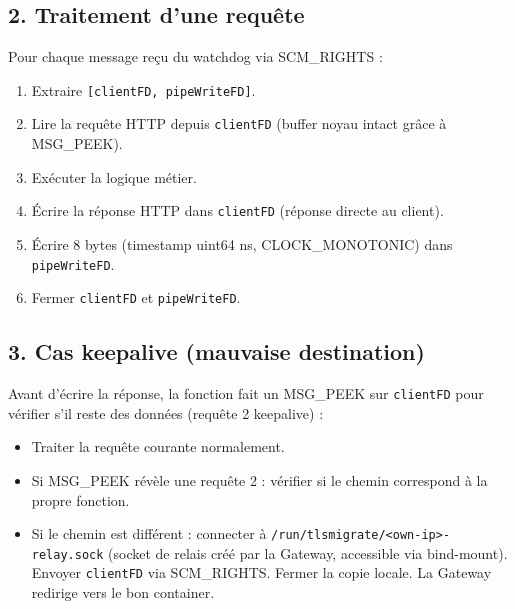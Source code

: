 \documentclass[11pt,a4paper]{article}
\begin{document}
\subsection{2. Traitement d'une requête}
Pour chaque message reçu du watchdog via SCM\_RIGHTS :
\begin{enumerate}
  \item Extraire \texttt{[clientFD, pipeWriteFD]}.
  \item Lire la requête HTTP depuis \texttt{clientFD} (buffer noyau intact grâce à MSG\_PEEK).
  \item Exécuter la logique métier.
  \item Écrire la réponse HTTP dans \texttt{clientFD} (réponse directe au client).
  \item Écrire 8 bytes (timestamp uint64 ns, CLOCK\_MONOTONIC) dans \texttt{pipeWriteFD}.
  \item Fermer \texttt{clientFD} et \texttt{pipeWriteFD}.
\end{enumerate}

\subsection{3. Cas keepalive (mauvaise destination)}
Avant d'écrire la réponse, la fonction fait un MSG\_PEEK sur \texttt{clientFD}
pour vérifier s'il reste des données (requête 2 keepalive) :
\begin{itemize}
  \item Traiter la requête courante normalement.
  \item Si MSG\_PEEK révèle une requête 2 : vérifier si le chemin correspond à la
    propre fonction.
  \item Si le chemin est différent : connecter à
    \texttt{/run/tlsmigrate/<own-ip>-relay.sock} (socket de relais créé par la Gateway,
    accessible via bind-mount). Envoyer \texttt{clientFD} via SCM\_RIGHTS.
    Fermer la copie locale. La Gateway redirige vers le bon container.
\end{itemize}

\end{document}
